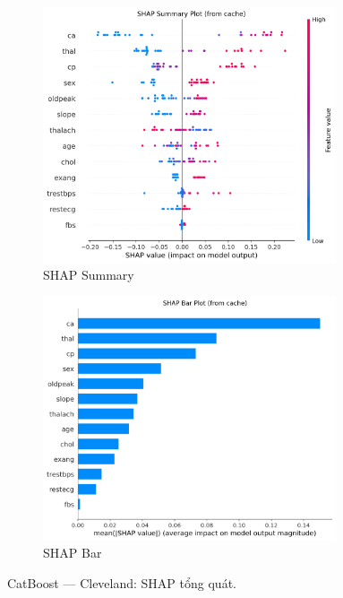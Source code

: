 \begin{figure}[H]
\centering
\begin{subfigure}[b]{0.48\textwidth}
\centering
\includegraphics[width=0.95\textwidth]{Result/cleveland_dataset/Catboost/SHAP/Summary.png}
\caption{SHAP Summary}
\label{fig:cat_clev_shap_summary}
\end{subfigure}\hfill
\begin{subfigure}[b]{0.48\textwidth}
\centering
\includegraphics[width=0.95\textwidth]{Result/cleveland_dataset/Catboost/SHAP/Bar.png}
\caption{SHAP Bar}
\label{fig:cat_clev_shap_bar}
\end{subfigure}
\caption{CatBoost — Cleveland: SHAP tổng quát.}
\label{fig:cat_clev_shap_overview}
\end{figure}

